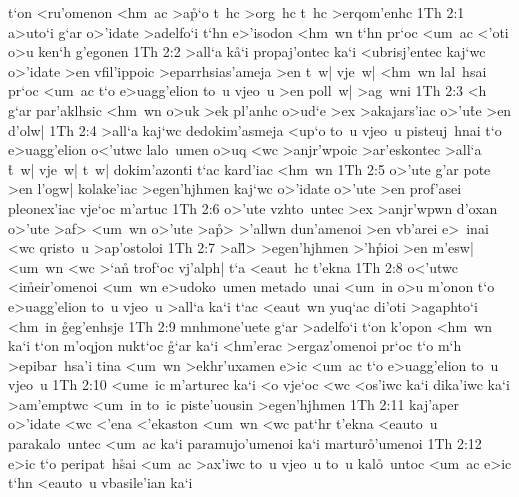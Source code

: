 t`on
<ru'omenon
<hm~ac
>a\r{p}`o
t~hc
>org~hc
t~hc
>erqom'enhc\bibvsend
\vs 1Th 2:1
a>uto`i
g`ar
o>'idate
>adelfo`i
t`hn
e>'isodon
<hm~wn
t`hn
pr`oc
<um~ac
<'oti
o>u
ken`h
g'egonen\bibvsend
\vs 1Th 2:2
>all`a
k\r{a}`i
propaj'ontec
ka`i
<ubrisj'entec
kaj`wc
o>'idate
>en
vfil'ippoic
>eparrhsias'ameja
>en
t~w|
vje~w|
<hm~wn
lal~hsai
pr`oc
<um~ac
t`o
e>uagg'elion
to~u
vjeo~u
>en
poll~w|
>ag~wni\bibvsend
\vs 1Th 2:3
<h
g`ar
par'aklhsic
<hm~wn
o>uk
>ek
pl'anhc
o>ud`e
>ex
>akajars'iac
o>'u\r{t}e
>en
d'olw|\bibvsend
\vs 1Th 2:4
>all`a
kaj`wc
dedokim'asmeja
<up`o
to~u
vjeo~u
pisteuj~hnai
t`o
e>uagg'elion
o<'utwc
lalo~umen
o>uq
<wc
>anjr'wpoic
>ar'eskontec
>all`a
\r{t}~w|
vje~w|
t~w|
dokim'azonti
t`ac
kard'iac
<hm~wn\bibvsend
\vs 1Th 2:5
o>'ute
g'ar
pote
>en
l'ogw|
kolake'iac
>egen'hjhmen
kaj`wc
o>'idate
o>'ute
>en
prof'asei
pleonex'iac
vje`oc
m'artuc\bibvsend
\vs 1Th 2:6
o>'ute
vzhto~untec
>ex
>anjr'wpwn
d'oxan
o>'ute
>af>
<um~wn
o>'ute
>a\r{p}>
>'allwn
dun'amenoi
>en
vb'arei
e>~inai
<wc
qristo~u
>ap'ostoloi\bibvsend
\vs 1Th 2:7
>al\r{l}>
>egen'hjhmen
>'h\r{p}ioi
>en
m'esw|
<um~wn
<wc
>`a\r{n}
trof`oc
vj'alph|
t`a
<eaut~hc
t'ekna\bibvsend
\vs 1Th 2:8
o<'utwc
<i\r{m}eir'omenoi
<um~wn
e>udoko~umen
metado~unai
<um~in
o>u
m'onon
t`o
e>uagg'elion
to~u
vjeo~u
>all`a
ka`i
t`ac
<eaut~wn
yuq`ac
di'oti
>agaphto`i
<hm~in
\r{g}eg'enhsje\bibvsend
{}
\vs 1Th 2:9
mnhmone'uete
g`ar
>adelfo`i
t`on
k'opon
<hm~wn
ka`i
t`on
m'oqjon
nukt`oc
\r{g}`ar
ka`i
<hm'erac
>ergaz'omenoi
pr`oc
t`o
m`h
>epibar~hsa'i
tina
<um~wn
>ekhr'uxamen
e>ic
<um~ac
t`o
e>uagg'elion
to~u
vjeo~u\bibvsend
\vs 1Th 2:10
<ume~ic
m'arturec
ka`i
<o
vje`oc
<wc
<os'iwc
ka`i
dika'iwc
ka`i
>am'emptwc
<um~in
to~ic
piste'uousin
>egen'hjhmen\bibvsend
\vs 1Th 2:11
kaj'aper
o>'idate
<wc
<'ena
<'ekaston
<um~wn
<wc
pat`hr
t'ekna
<eauto~u
parakalo~untec
<um~ac
ka`i
paramujo'umenoi
ka`i
martur\r{o}'umenoi\bibvsend
{}
\vs 1Th 2:12
e>ic
t`o
peripat~h\r{s}ai
<um~ac
>ax'iwc
to~u
vjeo~u
to~u
kal\r{o}~untoc
<um~ac
e>ic
t`hn
<eauto~u
vbasile'ian
ka`i
